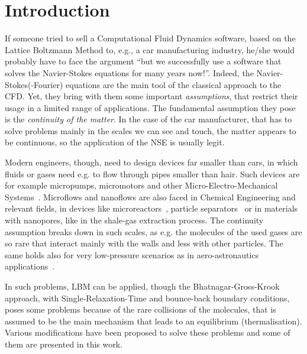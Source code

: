 \section{Introduction}
If someone tried to sell a Computational Fluid Dynamics software, based on
the Lattice Boltzmann Method to, e.g., a car manufacturing industry, he/she 
would probably have to face the argument ``but we successfully use a
software that solves the Navier-Stokes equations for many years now!''.
Indeed, the Navier-Stokes(-Fourier) equations are the main tool of the classical approach
to the CFD. Yet, they bring with them some important \textit{assumptions}, that restrict
their usage in a limited range of applications. The fundamental assumption they
pose is the \textit{continuity of the matter}. In the case of the car manufacturer,
that has to solve problems mainly in the scales we can see and touch, the matter
appears to be continuous, so the application of the NSE is usually legit. 

Modern engineers, though, need to design devices far smaller than cars, in which
fluids or gases need e.g. to flow through pipes smaller than hair. Such devices
are for example micropumps, micromotors and other Micro-Electro-Mechanical 
Systems~\cite{Karniadakis_Microflows}. Microflows and nanoflows are also faced 
in Chemical Engineering and relevant fields, in devices like microreactors~\cite{Neumann2012},
particle separators~\cite{Karniadakis_Microflows} or in materials with nanopores, 
like in the shale-gas extraction process. 
The continuity assumption breaks down in
such scales, as e.g. the molecules of the used gases are so rare that interact
mainly with the walls and less with other particles. The same holds also for
very low-pressure scenarios as in aero-astronautics applications~\cite{Toschi2005}.

In such problems, LBM can be applied, though the Bhatnagar-Gross-Krook approach, with Single-Relaxation-Time
and bounce-back boundary conditions,
poses some problems because of the rare collisions of the molecules, that is
assumed to be the main mechanism that leads to an equilibrium (thermalisation). Various
modifications have been proposed to solve these problems and some of them are 
presented in this work.